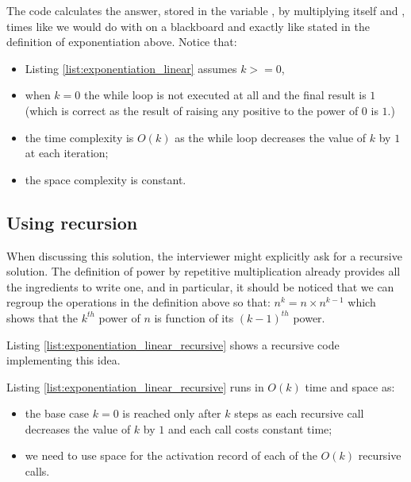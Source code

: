 

The code calculates the answer, stored in the variable , by multiplying  itself and ,  times like we would do with on a blackboard and exactly like stated in the definition of exponentiation above.
Notice that:
\begin{itemize}
    \item Listing \ref{list:exponentiation_linear} assumes $k >=0$,
    \item when $k=0$ the while loop is not executed at all and the final result is $1$ (which is correct as the result of raising any positive to the power of $0$ is $1$.)
    \item the time complexity is $O(k)$ as the while loop decreases the value of $k$ by $1$ at each iteration;
    \item the space complexity is constant. 
\end{itemize}

\subsection{Using recursion}
When discussing this solution, the interviewer might explicitly ask for a recursive solution. The definition of power by repetitive multiplication already provides all the ingredients to write one, and in particular, it should be noticed that we can regroup the operations in the definition above so that: $n^k = n \times n^{k-1}$ which shows that the ${k^{th}}$ power of $n$ is function of its ${(k-1)^{th}}$ power. 

Listing \ref{list:exponentiation_linear_recursive}  shows a recursive code implementing this idea.



Listing \ref{list:exponentiation_linear_recursive} runs in $O(k)$ time and space as:
\begin{itemize}
    \item the base case $k=0$ is reached only after $k$ steps as each recursive call decreases the value of $k$ by $1$ and each call costs constant time; 
    \item we need to use space for the activation record of each of the $O(k)$ recursive calls.
\end{itemize}



